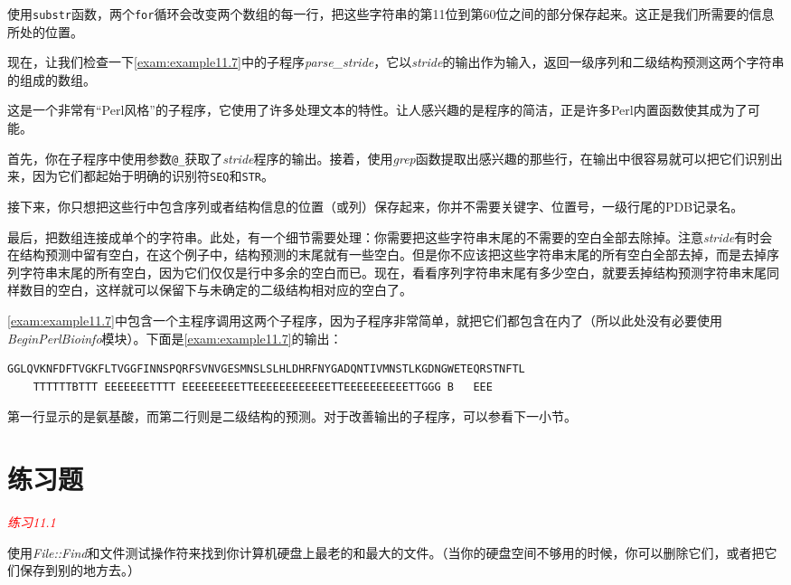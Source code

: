 使用\verb|substr|函数，两个\verb|for|循环会改变两个数组的每一行，把这些字符串的第11位到第60位之间的部分保存起来。这正是我们所需要的信息所处的位置。

现在，让我们检查一下\autoref{exam:example11.7}中的子程序\textit{parse\_stride}，它以\textit{stride}的输出作为输入，返回一级序列和二级结构预测这两个字符串的组成的数组。

这是一个非常有“Perl风格”的子程序，它使用了许多处理文本的特性。让人感兴趣的是程序的简洁，正是许多Perl内置函数使其成为了可能。

首先，你在子程序中使用参数\verb|@_|获取了\textit{stride}程序的输出。接着，使用\textit{grep}函数提取出感兴趣的那些行，在输出中很容易就可以把它们识别出来，因为它们都起始于明确的识别符\verb|SEQ|和\verb|STR|。

接下来，你只想把这些行中包含序列或者结构信息的位置（或列）保存起来，你并不需要关键字、位置号，一级行尾的PDB记录名。

最后，把数组连接成单个的字符串。此处，有一个细节需要处理：你需要把这些字符串末尾的不需要的空白全部去除掉。注意\textit{stride}有时会在结构预测中留有空白，在这个例子中，结构预测的末尾就有一些空白。但是你不应该把这些字符串末尾的所有空白全部去掉，而是去掉序列字符串末尾的所有空白，因为它们仅仅是行中多余的空白而已。现在，看看序列字符串末尾有多少空白，就要丢掉结构预测字符串末尾同样数目的空白，这样就可以保留下与未确定的二级结构相对应的空白了。

\autoref{exam:example11.7}中包含一个主程序调用这两个子程序，因为子程序非常简单，就把它们都包含在内了（所以此处没有必要使用\textit{BeginPerlBioinfo}模块）。下面是\autoref{exam:example11.7}的输出： 

\begin{lstlisting}
GGLQVKNFDFTVGKFLTVGGFINNSPQRFSVNVGESMNSLSLHLDHRFNYGADQNTIVMNSTLKGDNGWETEQRSTNFTL
    TTTTTTBTTT EEEEEEETTTT EEEEEEEEETTEEEEEEEEEEEETTEEEEEEEEEETTGGG B   EEE     
\end{lstlisting}

第一行显示的是氨基酸，而第二行则是二级结构的预测。对于改善输出的子程序，可以参看下一小节。

\section{练习题}
\textcolor{red}{\textit{练习11.1}}
\begin{adjustwidth}{4em}{}
使用\textit{File::Find}和文件测试操作符来找到你计算机硬盘上最老的和最大的文件。（当你的硬盘空间不够用的时候，你可以删除它们，或者把它们保存到别的地方去。）
\end{adjustwidth}

